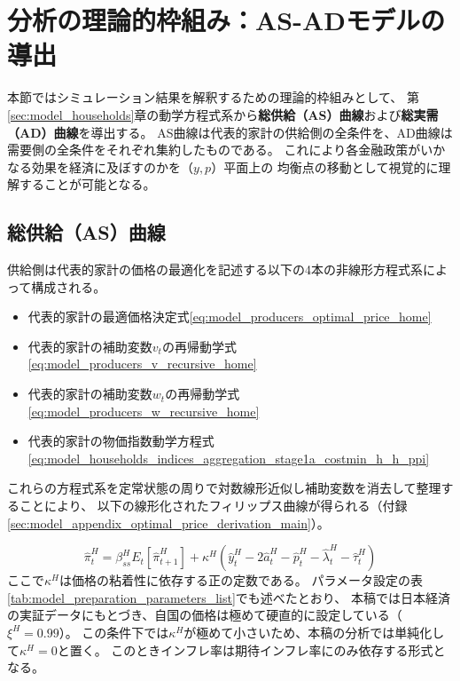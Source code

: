 
\section{分析の理論的枠組み：AS-ADモデルの導出}
\label{sec:results_asad_main}

本節ではシミュレーション結果を解釈するための理論的枠組みとして、
第\ref{sec:model_households}章の動学方程式系から\textbf{総供給（AS）曲線}および\textbf{総実需（AD）曲線}を導出する。
AS曲線は代表的家計の供給側の全条件を、AD曲線は需要側の全条件をそれぞれ集約したものである。
これにより各金融政策がいかなる効果を経済に及ぼすのかを（\(y,p\)）平面上の
均衡点の移動として視覚的に理解することが可能となる。



\subsection{総供給（AS）曲線}
\label{sec:results_asad_as}

供給側は代表的家計の価格の最適化を記述する以下の4本の非線形方程式系によって構成される。
\begin{itemize}
    \item 代表的家計の最適価格決定式\eqref{eq:model_producers_optimal_price_home}
    \item 代表的家計の補助変数\(v_t\)の再帰動学式\eqref{eq:model_producers_v_recursive_home}
    \item 代表的家計の補助変数\(w_t\)の再帰動学式\eqref{eq:model_producers_w_recursive_home}
    \item 代表的家計の物価指数動学方程式\eqref{eq:model_households_indices_aggregation_stage1a_costmin_h_h_ppi}
\end{itemize}
これらの方程式系を定常状態の周りで対数線形近似し補助変数を消去して整理することにより、
以下の線形化されたフィリップス曲線が得られる（付録\ref{sec:model_appendix_optimal_price_derivation_main}）。



\begin{equation}
\hat{\pi}_t^H=\beta_{ss}^HE_t[\hat{\pi}_{t+1}^H]+\kappa^H(\hat{y}_t^H-2\hat{a}_t^H-\hat{p}_t^H-\hat{\lambda}_t^H-\hat{\tau}_t^H)
\label{eq:results_asad_as_phillips}
\end{equation}
ここで\(\kappa^H\)は価格の粘着性に依存する正の定数である。
パラメータ設定の表\ref{tab:model_preparation_parameters_list}でも述べたとおり、
本稿では日本経済の実証データにもとづき、自国の価格は極めて硬直的に設定している（\(\xi^H=0.99\)）。
この条件下では\(\kappa^H\)が極めて小さいため、本稿の分析では単純化して\(\kappa^H=0\)と置く。
このときインフレ率は期待インフレ率にのみ依存する形式となる。

